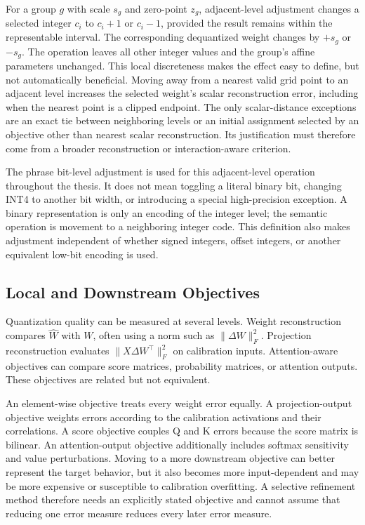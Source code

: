 For a group $g$ with scale $s_g$ and zero-point $z_g$, adjacent-level adjustment changes a selected integer $c_i$ to $c_i+1$ or $c_i-1$, provided the result remains within the representable interval. The corresponding dequantized weight changes by $+s_g$ or $-s_g$. The operation leaves all other integer values and the group's affine parameters unchanged. This local discreteness makes the effect easy to define, but not automatically beneficial. Moving away from a nearest valid grid point to an adjacent level increases the selected weight's scalar reconstruction error, including when the nearest point is a clipped endpoint. The only scalar-distance exceptions are an exact tie between neighboring levels or an initial assignment selected by an objective other than nearest scalar reconstruction. Its justification must therefore come from a broader reconstruction or interaction-aware criterion.

The phrase bit-level adjustment is used for this adjacent-level operation throughout the thesis. It does not mean toggling a literal binary bit, changing INT4 to another bit width, or introducing a special high-precision exception. A binary representation is only an encoding of the integer level; the semantic operation is movement to a neighboring integer code. This definition also makes adjustment independent of whether signed integers, offset integers, or another equivalent low-bit encoding is used.

\subsection{Local and Downstream Objectives}

Quantization quality can be measured at several levels. Weight reconstruction compares $\hat{W}$ with $W$, often using a norm such as $\|\Delta W\|_F^2$. Projection reconstruction evaluates $\|X\Delta W^\top\|_F^2$ on calibration inputs. Attention-aware objectives can compare score matrices, probability matrices, or attention outputs. These objectives are related but not equivalent.

An element-wise objective treats every weight error equally. A projection-output objective weights errors according to the calibration activations and their correlations. A score objective couples Q and K errors because the score matrix is bilinear. An attention-output objective additionally includes softmax sensitivity and value perturbations. Moving to a more downstream objective can better represent the target behavior, but it also becomes more input-dependent and may be more expensive or susceptible to calibration overfitting. A selective refinement method therefore needs an explicitly stated objective and cannot assume that reducing one error measure reduces every later error measure.

